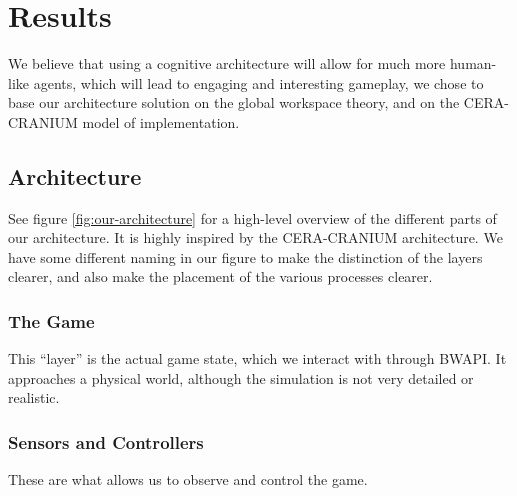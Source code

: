 
\chapter{Results}
We believe that using a cognitive architecture will allow for much
more human-like agents, which will lead to engaging and interesting gameplay, we
chose to base our architecture solution on the global workspace theory, and on the
CERA-CRANIUM\cite{arrabales2009ceracranium} model of implementation.

\section{Architecture}
See figure \ref{fig:our-architecture} for a high-level overview of the
different parts of our architecture. It is highly inspired by the CERA-CRANIUM
architecture. We have some different naming in our figure to make the
distinction of the layers clearer, and also make the placement of the various
processes clearer.

\subsection{The Game}
This ``layer'' is the actual game state, which we interact with through BWAPI.
It approaches a physical world, although the simulation is not very detailed or
realistic.

\subsection{Sensors and Controllers}
These are what allows us to observe and control the game.


